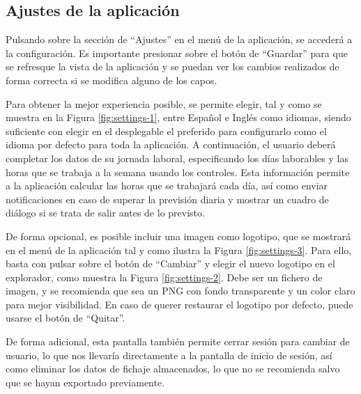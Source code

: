 \subsection{Ajustes de la aplicación}

Pulsando sobre la sección de “Ajustes” en el menú de la aplicación, se accederá a la configuración. Es importante presionar sobre el botón de “Guardar” para que se refresque la vista de la aplicación y se puedan ver los cambios realizados de forma correcta si se modifica alguno de los capos.

Para obtener la mejor experiencia posible, se permite elegir, tal y como se muestra en la Figura \ref{fig:settings-1}, entre Español e Inglés como idiomas, siendo suficiente con elegir en el desplegable el preferido para configurarlo como el idioma por defecto para toda la aplicación. A continuación, el usuario deberá completar los datos de su jornada laboral, especificando los días laborables y las horas que se trabaja a la semana usando los controles. Esta información permite a la aplicación calcular las horas que se trabajará cada día, así como enviar notificaciones en caso de superar la previsión diaria y mostrar un cuadro de diálogo si se trata de salir antes de lo previsto.

De forma opcional, es posible incluir una imagen como logotipo, que se mostrará en el menú de la aplicación tal y como ilustra la Figura \ref{fig:settings-3}. Para ello, basta con pulsar sobre el botón de “Cambiar” y elegir el nuevo logotipo en el explorador, como muestra la Figura \ref{fig:settings-2}. Debe ser un fichero de imagen, y se recomienda que sea un PNG con fondo transparente y un color claro para mejor visibilidad. En caso de querer restaurar el logotipo por defecto, puede usarse el botón de “Quitar”.

De forma adicional, esta pantalla también permite cerrar sesión para cambiar de usuario, lo que nos llevaría directamente a la pantalla de inicio de sesión, así como eliminar los datos de fichaje almacenados, lo que no se recomienda salvo que se hayan exportado previamente.

